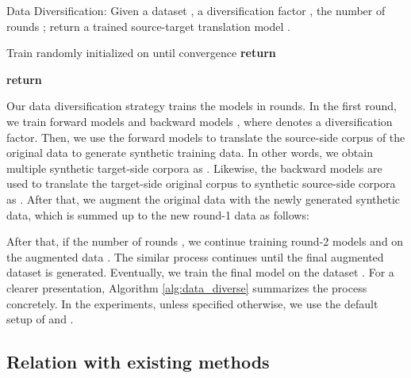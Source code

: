 \documentclass{article}
\begin{document}
\begin{algorithm*}[t!]
\caption{Data Diversification: Given a dataset , a diversification factor , the number of rounds ; return a trained source-target translation model .}
\label{alg:data_diverse}
\begin{algorithmic}[1]
\State Train randomly initialized  on  until convergence
    \State \textbf{return} 
\EndProcedure
\end{algorithmic}
\begin{algorithmic}[1]
    \State   {}
    \For{}
        \State 
        \For{}
            \State  {}
            \State  {}
            \State   {}
            \State   {}
        \EndFor
    \EndFor
    \State   {}
    \State \textbf{return} 
\EndProcedure
\end{algorithmic}
\end{algorithm*}



Our data diversification strategy trains the models in  rounds. In the first round, we train  forward models  and  backward models , where  denotes a diversification factor. 
Then, we use the forward models to translate the source-side corpus  of the original data to generate synthetic training data. In other words, we obtain multiple synthetic target-side corpora as . Likewise, the backward models are used to translate the target-side original corpus  to synthetic source-side corpora as .
After that, we augment the original data with the newly generated synthetic data, which is summed up to the new round-1 data  as follows:

After that, if the number of rounds , we continue training round-2 models  and  on the augmented data . The similar process continues until the final augmented dataset  is generated. Eventually, we train the final model  on the dataset . For a clearer presentation, Algorithm \ref{alg:data_diverse} summarizes the process concretely. In the experiments, unless specified otherwise, we use the default setup of  and .

\subsection{Relation with existing methods} \label{subsec:rel}
\end{document}
